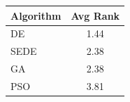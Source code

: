 \begin{table}[h]
\centering
\begin{tabular}{lc}
\hline
Algorithm & Avg Rank \\
\hline
DE & 1.44 \\
SEDE & 2.38 \\
GA & 2.38 \\
PSO & 3.81 \\
\hline
\end{tabular}
\end{table}

